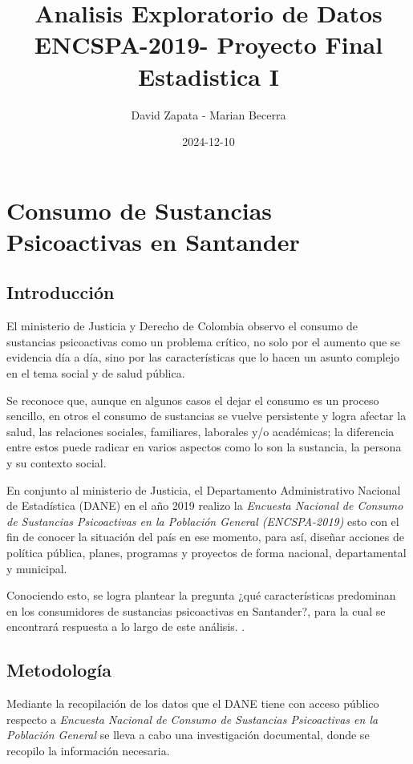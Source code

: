 \documentclass[
]{article}
\title{Analisis Exploratorio de Datos ENCSPA-2019- Proyecto Final
Estadistica I}
\author{David Zapata - Marian Becerra}
\date{2024-12-10}
\begin{document}
\maketitle

\section{Consumo de Sustancias Psicoactivas en
Santander}\label{consumo-de-sustancias-psicoactivas-en-santander}

\subsection{Introducción}\label{introducciuxf3n}

El ministerio de Justicia y Derecho de Colombia observo el consumo de
sustancias psicoactivas como un problema crítico, no solo por el aumento
que se evidencia día a día, sino por las características que lo hacen un
asunto complejo en el tema social y de salud pública.

Se reconoce que, aunque en algunos casos el dejar el consumo es un
proceso sencillo, en otros el consumo de sustancias se vuelve
persistente y logra afectar la salud, las relaciones sociales,
familiares, laborales y/o académicas; la diferencia entre estos puede
radicar en varios aspectos como lo son la sustancia, la persona y su
contexto social.

En conjunto al ministerio de Justicia, el Departamento Administrativo
Nacional de Estadística (DANE) en el año 2019 realizo la \emph{Encuesta
Nacional de Consumo de Sustancias Psicoactivas en la Población General
(ENCSPA-2019)} esto con el fin de conocer la situación del país en ese
momento, para así, diseñar acciones de política pública, planes,
programas y proyectos de forma nacional, departamental y municipal.

Conociendo esto, se logra plantear la pregunta ¿qué características
predominan en los consumidores de sustancias psicoactivas en Santander?,
para la cual se encontrará respuesta a lo largo de este análisis. .\\

\subsection{Metodología}\label{metodologuxeda}

Mediante la recopilación de los datos que el DANE tiene con acceso
público respecto a \emph{Encuesta Nacional de Consumo de Sustancias
Psicoactivas en la Población General} se lleva a cabo una investigación
documental, donde se recopilo la información necesaria.
\end{document}
